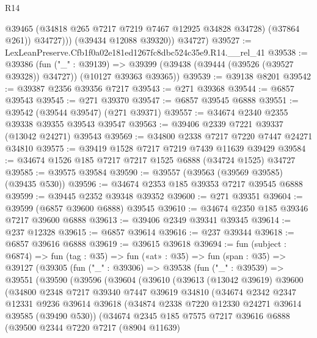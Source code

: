 \begin{lexlean}{R14}
\begin{coremodule}
                @39465
                (@34818 @265 @7217 @7219 @7467 @12925 @34828 @34728)
                (@37864 @261))
              @34727)))
        (@39434 @12088 @39320))
      @34727)
@39527 := LexLeanPreserve.Cfb1f0a02e181ed1267fc8dbc524c35e9.R14.__rel_41
@39538 := @39386
    (fun ("_" : @39139) =>
    @39399 (@39438 (@39444 (@39526 (@39527 @39328)) @34727)) (@10127 @39363 @39365))
@39539 := @39138 @8201
@39542 := @39387 @2356 @39356 @7217
@39543 := @271 @39368
@39544 := @6857 @39543
@39545 := @271 @39370
@39547 := @6857 @39545 @6888
@39551 := @39542 (@39544 @39547) (@271 @39371)
@39557 := @34674 @2340 @2355 @39338 @39355 @39543 @39547
@39563 := @39406 @2339 @7221 @39337 (@13042 @24271) @39543
@39569 := @34800 @2338 @7217 @7220 @7447 @24271 @34810
@39575 := @39419 @1528 @7217 @7219 @7439 @11639 @39429
@39584 := @34674 @1526 @185 @7217 @7217 @1525 @6888 (@34724 @1525) @34727
@39585 := @39575 @39584
@39590 := @39557 (@39563 (@39569 @39585) (@39435 @530))
@39596 := @34674 @2353 @185 @39353 @7217 @39545 @6888
@39599 := @39445 @2352 @39348 @39352
@39600 := @271 @39351
@39604 := @39599 (@6857 @39600 @6888) @39545
@39610 := @34674 @2350 @185 @39346 @7217 @39600 @6888
@39613 := @39406 @2349 @39341 @39345
@39614 := @237 @12328
@39615 := @6857 @39614
@39616 := @237 @39344
@39618 := @6857 @39616 @6888
@39619 := @39615 @39618
@39694 := fun (subject : @6874) =>
  fun (tag : @35) =>
  fun («at» : @35) =>
  fun (span : @35) =>
  @39127
    (@39305
      (fun ("_" : @39306) =>
      @39538
        (fun ("_" : @39539) =>
        @39551
          (@39590
            (@39596
              (@39604
                (@39610
                  (@39613
                    (@13042 @39619)
                    @39600
                    (@34800
                      @2348
                      @7217
                      @39340
                      @7447
                      @39619
                      @34810
                      (@34674
                        @2342
                        @2347
                        @12331
                        @9236
                        @39614
                        @39618
                        (@34874 @2338 @7220 @12330 @24271 @39614 @39585 (@39490 @530))
                        (@34674
                          @2345
                          @185
                          @7575
                          @7217
                          @39616
                          @6888
                          (@39500
                            @2344
                            @7220
                            @7217
                            (@8904 @11639)

\end{coremodule}
\end{lexlean}
